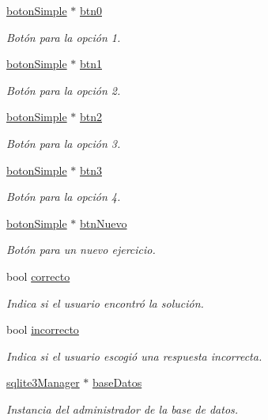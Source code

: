 \begin{DoxyCompactItemize}
\hyperlink{classboton_simple}{boton\+Simple} $\ast$ \hyperlink{classespacio_tarjetas_a1b66f906dbd856b501412a42c50da0af}{btn0}
\begin{DoxyCompactList}\small\item\em Botón para la opción 1. \end{DoxyCompactList}\item 
\hyperlink{classboton_simple}{boton\+Simple} $\ast$ \hyperlink{classespacio_tarjetas_a6f9729b868bcfef80cd3c71e22950425}{btn1}
\begin{DoxyCompactList}\small\item\em Botón para la opción 2. \end{DoxyCompactList}\item 
\hyperlink{classboton_simple}{boton\+Simple} $\ast$ \hyperlink{classespacio_tarjetas_ab0d28914026c02d7bd073d79e9c2f84e}{btn2}
\begin{DoxyCompactList}\small\item\em Botón para la opción 3. \end{DoxyCompactList}\item 
\hyperlink{classboton_simple}{boton\+Simple} $\ast$ \hyperlink{classespacio_tarjetas_a4653cac995a8e25b99d45403b626bb70}{btn3}
\begin{DoxyCompactList}\small\item\em Botón para la opción 4. \end{DoxyCompactList}\item 
\hyperlink{classboton_simple}{boton\+Simple} $\ast$ \hyperlink{classespacio_tarjetas_aa306e2b163d2a22805517fb24a728212}{btn\+Nuevo}
\begin{DoxyCompactList}\small\item\em Botón para un nuevo ejercicio. \end{DoxyCompactList}\item 
bool \hyperlink{classespacio_tarjetas_a4c37d0072ed7e82f1133641d8cdae713}{correcto}
\begin{DoxyCompactList}\small\item\em Indica si el usuario encontró la solución. \end{DoxyCompactList}\item 
bool \hyperlink{classespacio_tarjetas_aec7ea4a5a0e9f386d8d256f2444ebfaf}{incorrecto}
\begin{DoxyCompactList}\small\item\em Indica si el usuario escogió una respuesta incorrecta. \end{DoxyCompactList}\item 
\hyperlink{classsqlite3_manager}{sqlite3\+Manager} $\ast$ \hyperlink{classespacio_tarjetas_ae26629329afda23bc6252054dcad92d3}{base\+Datos}
\begin{DoxyCompactList}\small\item\em Instancia del administrador de la base de datos. \end{DoxyCompactList}\end{DoxyCompactItemize}
